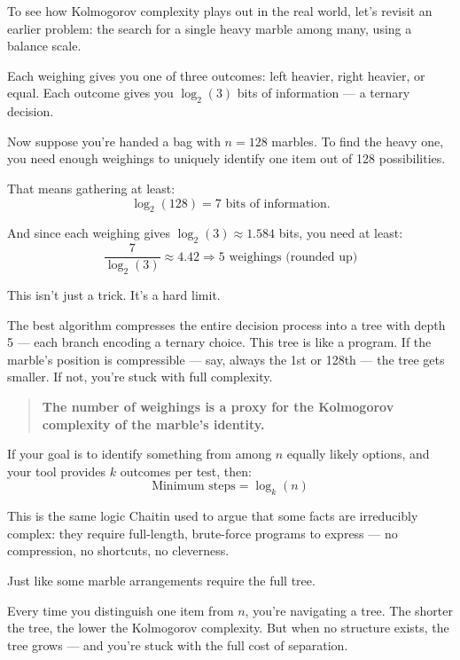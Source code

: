 To see how Kolmogorov complexity plays out in the real world, let’s revisit an earlier problem:  
the search for a single heavy marble among many, using a balance scale.

Each weighing gives you one of three outcomes: left heavier, right heavier, or equal.  
Each outcome gives you \(\log_2(3)\) bits of information — a ternary decision.

Now suppose you're handed a bag with \( n = 128 \) marbles.  
To find the heavy one, you need enough weighings to uniquely identify one item out of 128 possibilities.

That means gathering at least:
\[
\log_2(128) = 7 \text{ bits of information.}
\]

And since each weighing gives \( \log_2(3) \approx 1.584 \) bits,  
you need at least:
\[
\frac{7}{\log_2(3)} \approx 4.42 \Rightarrow 5 \text{ weighings (rounded up)}
\]

This isn't just a trick. It's a hard limit.

The best algorithm compresses the entire decision process into a tree with depth 5 — each branch encoding a ternary choice. This tree is like a program. If the marble’s position is compressible — say, always the 1st or 128th — the tree gets smaller. If not, you’re stuck with full complexity.

\begin{quote}
\textbf{The number of weighings is a proxy for the Kolmogorov complexity of the marble’s identity.}
\end{quote}

If your goal is to identify something from among \( n \) equally likely options,  
and your tool provides \( k \) outcomes per test,  
then:
\[
\text{Minimum steps} = \log_k(n)
\]

This is the same logic Chaitin used to argue that some facts are irreducibly complex:  
they require full-length, brute-force programs to express — no compression, no shortcuts, no cleverness.

Just like some marble arrangements require the full tree.

\begin{tcolorbox}[colback=gray!5!white, colframe=black, title=\textbf{Compression Is a Search Tree}]
Every time you distinguish one item from \( n \), you’re navigating a tree.  
The shorter the tree, the lower the Kolmogorov complexity.  
But when no structure exists, the tree grows — and you’re stuck with the full cost of separation.
\end{tcolorbox}



